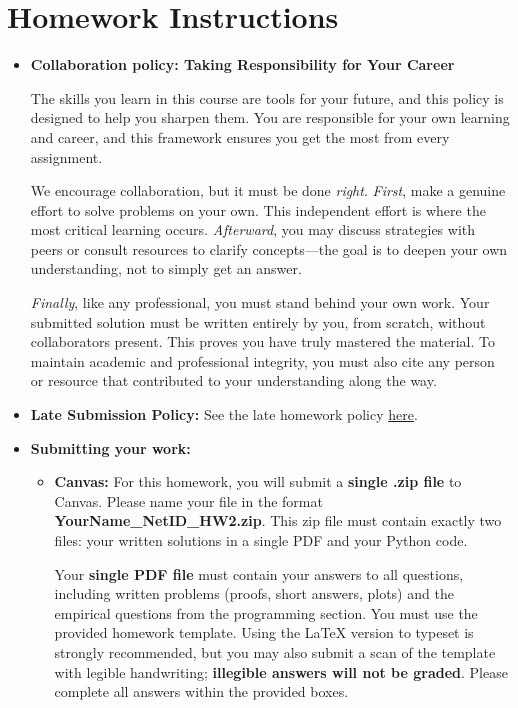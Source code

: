 \documentclass[12pt]{article}
\begin{document}
\section*{Homework Instructions}
\begin{itemize}
\item \textbf{Collaboration policy: Taking Responsibility for Your Career} 

The skills you learn in this course are tools for your future, and this policy is designed to help you sharpen them. You are responsible for your own learning and career, and this framework ensures you get the most from every assignment.

We encourage collaboration, but it must be done \emph{right}. \emph{First}, make a genuine effort to solve problems on your own. This independent effort is where the most critical learning occurs. \emph{Afterward}, you may discuss strategies with peers or consult resources to clarify concepts—the goal is to deepen your own understanding, not to simply get an answer.

\emph{Finally}, like any professional, you must stand behind your own work. Your submitted solution must be written entirely by you, from scratch, without collaborators present. This proves you have truly mastered the material. To maintain academic and professional integrity, you must also cite any person or resource that contributed to your understanding along the way. 

\item\textbf{Late Submission Policy:} See the late homework policy \href{https://docs.google.com/document/d/1lYopNzjn_0AOipRiiwO4h2Ow64seQNeD/edit?usp=sharing&ouid=114000599194691965836&rtpof=true&sd=true}{here}.

\item\textbf{Submitting your work:} 

\begin{itemize}

\item \textbf{Canvas:} 
For this homework, you will submit a \textbf{single .zip file} to Canvas. Please name your file in the format \textbf{YourName\_NetID\_HW2.zip}. This zip file must contain exactly two files: your written solutions in a single PDF and your Python code.

Your \textbf{single PDF file} must contain your answers to all questions, including written problems (proofs, short answers, plots) and the empirical questions from the programming section. You must use the provided homework template. Using the LaTeX version to typeset is strongly recommended, but you may also submit a scan of the template with legible handwriting; \textbf{illegible answers will not be graded}. Please complete all answers within the provided boxes. 


\end{itemize}
\end{itemize}
\end{document}
